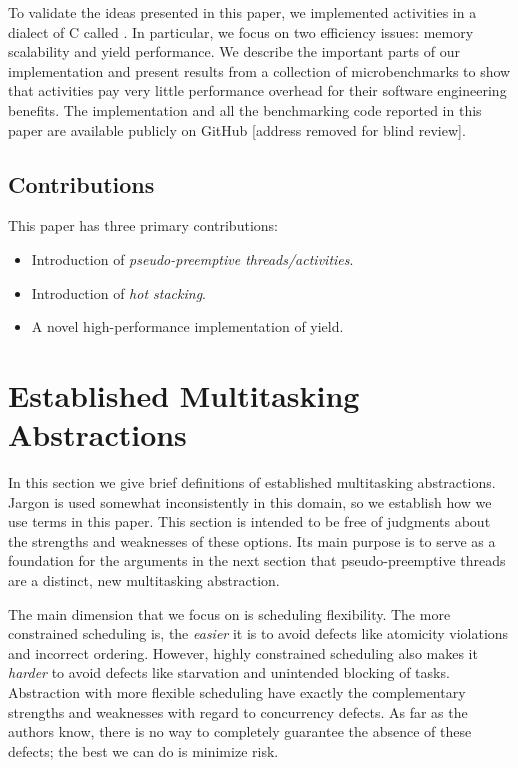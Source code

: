 \documentclass[9pt,preprint]{sigplanconf-2}
\begin{document}
To validate the ideas presented in this paper, we implemented activities in a dialect of C called \charcoal{}.
In particular, we focus on two efficiency issues: memory scalability and yield performance.
We describe the important parts of our implementation and present results from a collection of microbenchmarks to show that activities pay very little performance overhead for their software engineering benefits.
The \charcoal{} implementation and all the benchmarking code reported in this paper are available publicly on GitHub [address removed for blind review].


\subsection{Contributions}

This paper has three primary contributions:

\begin{itemize}
\item Introduction of \emph{pseudo-preemptive threads/activities}.
\item Introduction of \emph{hot stacking}.
\item A novel high-performance implementation of yield.
\end{itemize}


\section{Established Multitasking Abstractions}

In this section we give brief definitions of established multitasking abstractions.
Jargon is used somewhat inconsistently in this domain, so we establish how we use terms in this paper.
This section is intended to be free of judgments about the strengths and weaknesses of these options.
Its main purpose is to serve as a foundation for the arguments in the next section that pseudo-preemptive threads are a distinct, new multitasking abstraction.

The main dimension that we focus on is scheduling flexibility.
The more constrained scheduling is, the \emph{easier} it is to avoid defects like atomicity violations and incorrect ordering.
However, highly constrained scheduling also makes it \emph{harder} to avoid defects like starvation and unintended blocking of tasks.
Abstraction with more flexible scheduling have exactly the complementary strengths and weaknesses with regard to concurrency defects.
As far as the authors know, there is no way to completely guarantee the absence of these defects; the best we can do is minimize risk.
\end{document}
